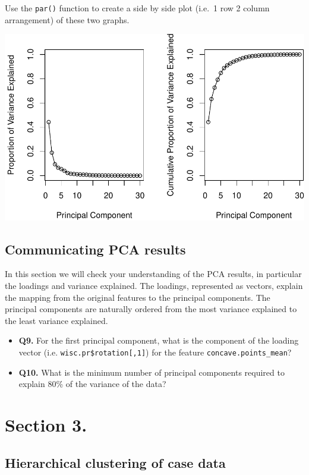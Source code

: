 \documentclass[]{article}
\begin{document}
Use the \texttt{par()} function to create a side by side plot (i.e.~1
row 2 column arrangement) of these two graphs.

\includegraphics{lecture9_lab_files/figure-latex/unnamed-chunk-10-1.pdf}

\subsection{Communicating PCA results}\label{communicating-pca-results}

In this section we will check your understanding of the PCA results, in
particular the loadings and variance explained. The loadings,
represented as vectors, explain the mapping from the original features
to the principal components. The principal components are naturally
ordered from the most variance explained to the least variance
explained.

\begin{itemize}
\item
  \textbf{Q9.} For the first principal component, what is the component
  of the loading vector (i.e. \texttt{wisc.pr\$rotation{[},1{]}}) for
  the feature \texttt{concave.points\_mean}?
\item
  \textbf{Q10.} What is the minimum number of principal components
  required to explain 80\% of the variance of the data?
\end{itemize}

\section{Section 3.}\label{section-3.}

\subsection{Hierarchical clustering of case
data}\label{hierarchical-clustering-of-case-data}
\end{document}
